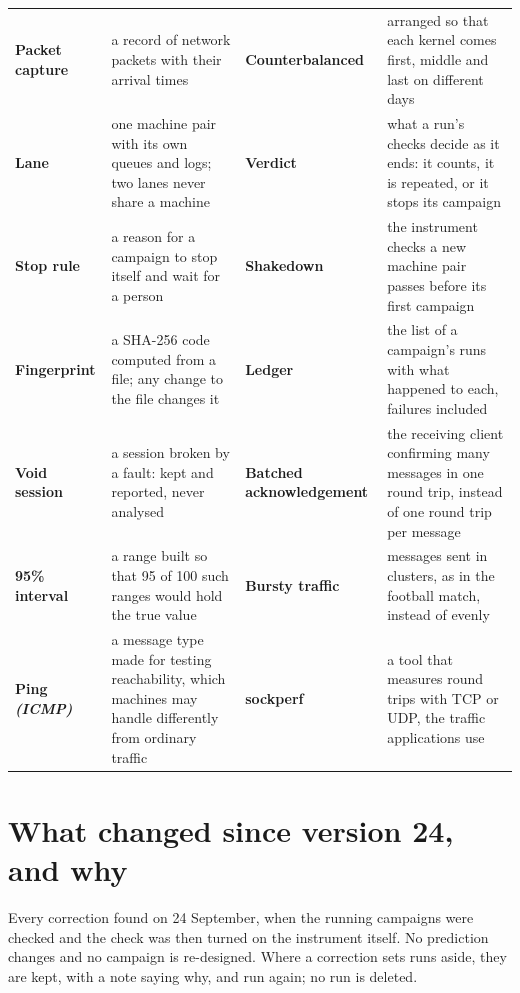 \documentclass[11pt]{article}
\newcommand{\gl}[1]{{\color{soft}\itshape\small (#1)}}
\begin{document}
{\begin{tabularx}{\linewidth}{@{}>{\bfseries}p{3.1cm} X >{\bfseries}p{3.1cm} X@{}}
Packet capture & a record of network packets with their arrival times & Counterbalanced & arranged so that each kernel comes first, middle and last on different days \\
Lane & one machine pair with its own queues and logs; two lanes never share a machine & Verdict & what a run's checks decide as it ends: it counts, it is repeated, or it stops its campaign \\
Stop rule & a reason for a campaign to stop itself and wait for a person & Shakedown & the instrument checks a new machine pair passes before its first campaign \\
Fingerprint & a SHA-256 code computed from a file; any change to the file changes it & Ledger & the list of a campaign's runs with what happened to each, failures included \\
Void session & a session broken by a fault: kept and reported, never analysed & Batched acknowledgement & the receiving client confirming many messages in one round trip, instead of one round trip per message \\
95\% interval & a range built so that 95 of 100 such ranges would hold the true value & Bursty traffic & messages sent in clusters, as in the football match, instead of evenly \\
Ping \gl{ICMP} & a message type made for testing reachability, which machines may handle differently from ordinary traffic & sockperf & a tool that measures round trips with TCP or UDP, the traffic applications use \\
\end{tabularx}}

\section*{What changed since version 24, and why}
Every correction found on 24 September, when the running campaigns were checked and the check
was then turned on the instrument itself. No prediction changes and no campaign is re-designed.
Where a correction sets runs aside, they are kept, with a note saying why, and run again; no
run is deleted.
\end{document}

